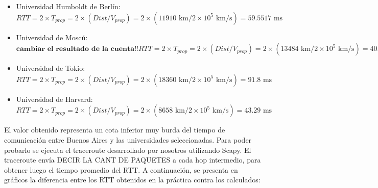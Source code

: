 \begin{itemize}
 \item Universidad Humboldt de Berlín: 
\begin{equation}
 	RTT = 2 \times T_{prop} = 2 \times (Dist / V_{prop}) = 2 \times (11910 \text{ km} / 2\times10^5 \text{ km/s}) = 59.5517  \text{ ms}
\end{equation}
 
 \item Universidad de Moscú: 
 \begin{equation}
	\textbf{cambiar el resultado de la cuenta!!}
 	RTT = 2 \times T_{prop} = 2 \times (Dist / V_{prop}) = 2 \times (13484 \text{ km} / 2\times10^5 \text{ km/s}) = 40.655 \text{ ms}
 \end{equation}
 
 \item Universidad de Tokio: 
 \begin{equation}
 	RTT = 2 \times T_{prop} = 2 \times (Dist / V_{prop}) = 2 \times (18360  \text{ km} / 2\times10^5 \text{ km/s}) = 91.8 \text{ ms}
 \end{equation}
 
 \item Universidad de Harvard: 
 \begin{equation}
 	RTT = 2 \times T_{prop} = 2 \times (Dist / V_{prop}) = 2 \times (8658 \text{ km} / 2\times10^5 \text{ km/s}) = 43.29 \text{ ms}
 \end{equation}
 
\end{itemize}

El valor obtenido representa un cota inferior muy burda del tiempo de comunicación entre Buenos Aires y las universidades seleccionadas. Para poder probarlo se ejecuta el traceroute desarrollado por nosotros utilizando Scapy. El traceroute envía DECIR LA CANT DE PAQUETES a cada hop intermedio, para obtener luego el tiempo promedio del RTT. A continuación, se presenta en gráficos la diferencia entre los RTT obtenidos en la práctica contra los calculados:





